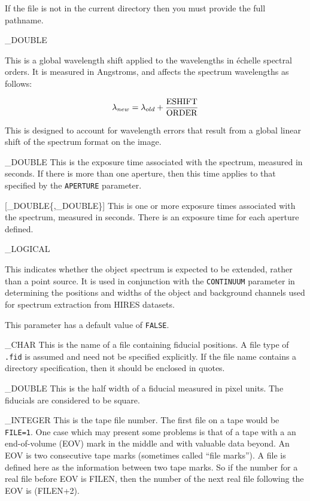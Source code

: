 {{   If the file is not in the current directory then you must provide
   the full pathname.
}

{
   \_DOUBLE
}{
   This is a global wavelength shift applied to the wavelengths in
   \'{e}chelle spectral orders.
   It is measured in Angstroms, and affects the spectrum wavelengths as follows:

   \begin {equation}
      \lambda _{new} = \lambda _{old} + \frac{\rm ESHIFT}{\rm ORDER}
   \end {equation}

   This is designed to account for wavelength errors that result
   from a global linear shift of the spectrum format on the
   image.
}

{
   \_DOUBLE
}{
   This is the exposure time associated with the spectrum, measured in seconds.
   If there is more than one aperture, then this time applies
   to that specified by the \verb+APERTURE+ parameter.
}

{
   [\_DOUBLE\{,\_DOUBLE\}]
}{
   This is one or more exposure times associated with the
   spectrum, measured in seconds.
   There is an exposure time for each aperture defined.
}

{
   \_LOGICAL
}{
   This indicates whether the object spectrum is expected to be extended,
   rather than a point source.
   It is used in conjunction with the \verb+CONTINUUM+ parameter in determining
   the positions and widths of the object and background channels used
   for spectrum extraction from HIRES datasets.

   This parameter has a default value of \verb+FALSE+\@.
}

{
   \_CHAR
}{
   This is the name of a file containing fiducial positions.
   A file type of \verb+.fid+ is assumed and need not be specified
   explicitly.
   If the file name contains a directory specification, then it should be
   enclosed in quotes.
}

{
   \_DOUBLE
}{
   This is the half width of a fiducial measured in pixel units. The fiducials
   are considered to be square.
}

{
   \_INTEGER
}{
   This is the tape file number.
   The first file on a tape would be \verb+FILE=1+\@.
   One case which may present some problems is
   that of a tape with a an end-of-volume (EOV) mark in the middle
   and with valuable data beyond.
   An EOV is two consecutive tape marks (sometimes called ``file marks'').
   A file is defined here as the information between two tape marks.
   So if the number for a real file before EOV is FILEN, then
   the number of the next real file following the EOV is (FILEN+2).
}

}
